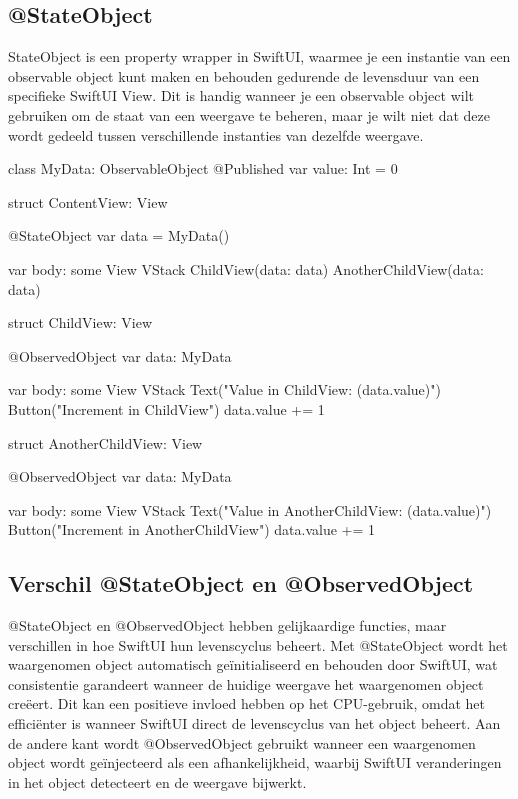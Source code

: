 \subsection{@StateObject}
\Autocite{AppleStateObject} StateObject is een property wrapper in SwiftUI, waarmee je een instantie van een observable object kunt maken en behouden gedurende de levensduur van een specifieke SwiftUI View. Dit is handig wanneer je een observable object wilt gebruiken om de staat van een weergave te beheren, maar je wilt niet dat deze wordt gedeeld tussen verschillende instanties van dezelfde weergave.

\begin{swift}[caption=Example of StateObject, label=stateobject_example]
class MyData: ObservableObject {
    @Published var value: Int = 0
}

struct ContentView: View {
    @StateObject var data = MyData()
    
    var body: some View {
        VStack {
            ChildView(data: data)
            AnotherChildView(data: data)
        }
    }
}

struct ChildView: View {
    @ObservedObject var data: MyData
    
    var body: some View {
        VStack {
            Text("Value in ChildView: (data.value)")
            Button("Increment in ChildView") {
                data.value += 1
            }
        }
    }
}
struct AnotherChildView: View {
    @ObservedObject var data: MyData
    
    var body: some View {
        VStack {
            Text("Value in AnotherChildView: (data.value)")
            Button("Increment in AnotherChildView") {
                data.value += 1
            }
        }
    }
}

\end{swift}

\subsection{Verschil @StateObject en @ObservedObject}
\autocite{MediumDifferenceStateObjObservedObj} @StateObject en @ObservedObject hebben gelijkaardige functies, maar verschillen in hoe SwiftUI hun levenscyclus beheert. Met @StateObject wordt het waargenomen object automatisch geïnitialiseerd en behouden door SwiftUI, wat consistentie garandeert wanneer de huidige weergave het waargenomen object creëert. Dit kan een positieve invloed hebben op het CPU-gebruik, omdat het efficiënter is wanneer SwiftUI direct de levenscyclus van het object beheert. Aan de andere kant wordt @ObservedObject gebruikt wanneer een waargenomen object wordt geïnjecteerd als een afhankelijkheid, waarbij SwiftUI veranderingen in het object detecteert en de weergave bijwerkt.

